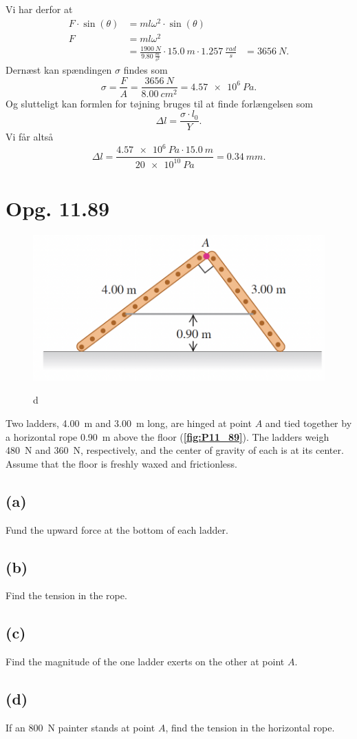 \documentclass[12pt]{article}
\theoremstyle{definition}
\begin{document}
Vi har derfor at
\begin{align*}
  F\cdot \sin(\theta) &= ml\omega^2 \cdot \sin(\theta) \\
  F &= ml\omega^2 \\
    &= \frac{\qty{1900}{N}}{\qty{9.80}{\frac{m}{s^2}}} \cdot \qty{15,0}{m} \cdot \qty{1,257}{\frac{rad}{s}}
    &= \qty{3656}{N} 
.\end{align*}
Dernæst kan spændingen $\sigma$ findes som
\[ 
  \sigma = \frac{F}{A} = \frac{\qty{3656}{N}}{\qty{8,00}{cm^2}} = \qty{4,57e6}{Pa} 
.\]
Og slutteligt kan formlen for tøjning bruges til at finde forlængelsen som
\[ 
\Delta l = \frac{\sigma \cdot l_0}{Y}
.\]
Vi får altså
\[ 
\Delta l = \frac{\qty{4,57e6}{Pa} \cdot \qty{15,0}{m}}{\qty{20e10}{Pa}} = \qty{0,34}{mm} 
.\]



\section*{Opg. 11.89}
\begin{figure} [ht]
  \centering
  \caption{d}
  \includegraphics[width=0.5\linewidth]{../figures/P11_89.png}
  \label{fig:P11_89}
\end{figure}

Two ladders, \qty{4,00}{m} and \qty{3,00}{m} long, are hinged at point $A$ and tied together by a horizontal rope \qty{0,90}{m} above the floor (\textbf{\autoref{fig:P11_89}}). The ladders weigh \qty{480}{N} and \qty{360}{N}, respectively, and the center of gravity of each is at its center. Assume that the floor is freshly waxed and frictionless.

\subsection*{(a)}
Fund the upward force at the bottom of each ladder.

\subsection*{(b)}
Find the tension in the rope.

\subsection*{(c)}
Find the magnitude of the one ladder exerts on the other at point $A$.

\subsection*{(d)}
If an \qty{800}{N} painter stands at point $A$, find the tension in the horizontal rope.
\end{document}
